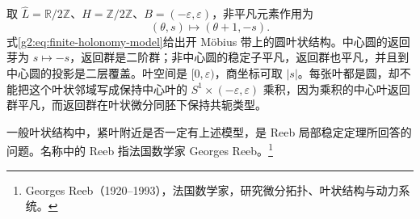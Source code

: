 \begin{example}\label{g2:exm:mobius-finite-holonomy}
	取 \(\widehat L=\mathbb R/2\mathbb Z\)、\(H=\mathbb Z/2\mathbb Z\)、\(B=(-\varepsilon,\varepsilon)\)，非平凡元素作用为
	\[
		(\theta,s)\longmapsto(\theta+1,-s).
	\]
	式\eqref{g2:eq:finite-holonomy-model}给出开 Möbius 带上的圆叶状结构。中心圆的返回芽为 \(s\mapsto-s\)，返回群是二阶群；非中心圆的稳定子平凡，返回群也平凡，并且到中心圆的投影是二层覆盖。叶空间是 \([0,\varepsilon)\)，商坐标可取 \(|s|\)。每张叶都是圆，却不能把这个叶状邻域写成保持中心叶的 \(S^1\times(-\varepsilon,\varepsilon)\) 乘积，因为乘积的中心叶返回群平凡，而返回群在叶状微分同胚下保持共轭类型。
\end{example}

一般叶状结构中，紧叶附近是否一定有上述模型，是 Reeb 局部稳定定理所回答的问题。名称中的 Reeb 指法国数学家 Georges Reeb。\footnote{Georges Reeb（1920--1993），法国数学家，研究微分拓扑、叶状结构与动力系统。}

